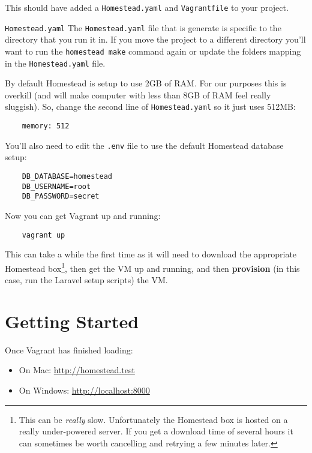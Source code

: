 This should have added a \texttt{Homestead.yaml} and \texttt{Vagrantfile} to your project.
\\

\begin{infobox}{\texttt{Homestead.yaml}}
    The \texttt{Homestead.yaml} file that is generate is specific to the directory that you run it in. If you move the project to a different directory you'll want to run the \texttt{homestead make} command again or update the folders mapping in the \texttt{Homestead.yaml} file.
\end{infobox}

By default Homestead is setup to use 2GB of RAM. For our purposes this is overkill (and will make computer with less than 8GB of RAM feel really sluggish). So, change the second line of \texttt{Homestead.yaml} so it just uses 512MB:

\begin{verbatim}
    memory: 512
\end{verbatim}

You'll also need to edit the \texttt{.env} file to use the default Homestead database setup:

\begin{verbatim}
    DB_DATABASE=homestead
    DB_USERNAME=root
    DB_PASSWORD=secret
\end{verbatim}

Now you can get Vagrant up and running:

\begin{verbatim}
    vagrant up
\end{verbatim}

This can take a while the first time as it will need to download the appropriate Homestead box\footnote{This can be \textit{really} slow. Unfortunately the Homestead box is hosted on a really under-powered server. If you get a download time of several hours it can sometimes be worth cancelling and retrying a few minutes later.}, then get the VM up and running, and then \textbf{provision} (in this case, run the Laravel setup scripts) the VM.


\pagebreak


\section{Getting Started}

Once Vagrant has finished loading:

\begin{itemize}
    \item On Mac: \href{http://homestead.test}{http://homestead.test}
    \item On Windows: \href{http://localhost:8000}{http://localhost:8000}
\end{itemize}

